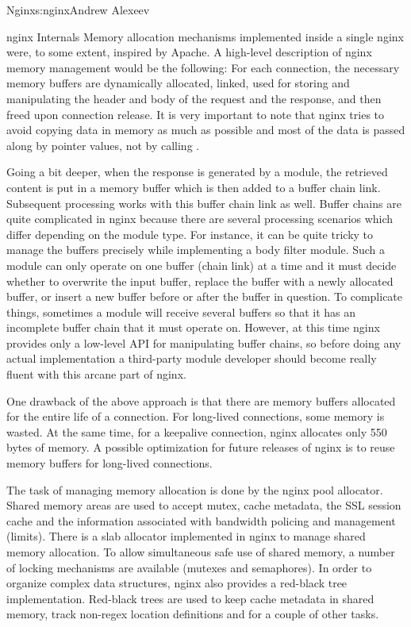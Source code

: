 \begin{aosachapter}{Nginx}{s:nginx}{Andrew Alexeev}
\begin{aosasect1}{nginx Internals}
Memory allocation mechanisms implemented inside a single nginx
 were, to some extent, inspired by Apache. A high-level
description of nginx memory management would be the following: For
each connection, the necessary memory buffers are dynamically
allocated, linked, used for storing and manipulating the header and
body of the request and the response, and then freed upon connection
release. It is very important to note that nginx tries to avoid
copying data in memory as much as possible and most of the data is
passed along by pointer values, not by calling .

Going a bit deeper, when the response is generated by a module, the
retrieved content is put in a memory buffer which is then added to a
buffer chain link. Subsequent processing works with this buffer chain
link as well. Buffer chains are quite complicated in nginx because
there are several processing scenarios which differ depending on the module
type. For instance, it can be quite tricky to manage the buffers
precisely while implementing a body filter module. Such a module can
only operate on one buffer (chain link) at a time and it must decide
whether to overwrite the input buffer, replace the buffer with a newly
allocated buffer, or insert a new buffer before or after the buffer in
question. To complicate things, sometimes a module will receive
several buffers so that it has an incomplete buffer chain that it must
operate on. However, at this time nginx provides only a low-level API
for manipulating buffer chains, so before doing any actual
implementation a third-party module developer should become really
fluent with this arcane part of nginx.

One drawback of the above approach is that there are memory buffers
allocated for the entire life of a connection. For long-lived
connections, some memory is wasted. At the same time, for a keepalive
connection, nginx allocates only 550 bytes of memory. A possible
optimization for future releases of nginx is to reuse memory buffers
for long-lived connections.

The task of managing memory allocation is done by the nginx pool
allocator. Shared memory areas are used to accept mutex, cache
metadata, the SSL session cache and the information associated with
bandwidth policing and management (limits). There is a slab allocator
implemented in nginx to manage shared memory allocation. To allow
simultaneous safe use of shared memory, a number of locking mechanisms
are available (mutexes and semaphores). In order to organize complex
data structures, nginx also provides a red-black tree
implementation. Red-black trees are used to keep cache metadata in
shared memory, track non-regex location definitions and for a couple of
other tasks.


\end{aosasect1}
\end{aosachapter}
